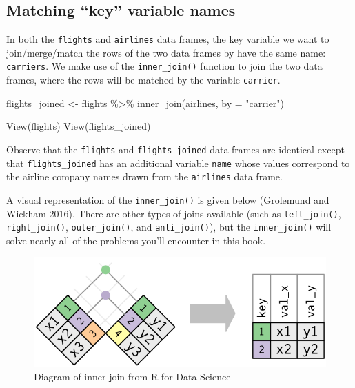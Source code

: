 \documentclass[
  letterpaper,
  DIV=11,
  numbers=noendperiod]{scrreprt}
\newenvironment{Shaded}{\begin{snugshade}}{\end{snugshade}}
\newcommand{\AttributeTok}[1]{\textcolor[rgb]{0.40,0.45,0.13}{#1}}
\newcommand{\FunctionTok}[1]{\textcolor[rgb]{0.28,0.35,0.67}{#1}}
\newcommand{\NormalTok}[1]{\textcolor[rgb]{0.00,0.23,0.31}{#1}}
\newcommand{\OtherTok}[1]{\textcolor[rgb]{0.00,0.23,0.31}{#1}}
\newcommand{\SpecialCharTok}[1]{\textcolor[rgb]{0.37,0.37,0.37}{#1}}
\newcommand{\StringTok}[1]{\textcolor[rgb]{0.13,0.47,0.30}{#1}}
\theoremstyle{definition}
\theoremstyle{remark}
\begin{document}
\hypertarget{matching-key-variable-names}{%
\subsection{Matching ``key'' variable
names}\label{matching-key-variable-names}}

In both the \texttt{flights} and \texttt{airlines} data frames, the key
variable we want to join/merge/match the rows of the two data frames by
have the same name: \texttt{carriers}. We make use of the
\texttt{inner\_join()} function to join the two data frames, where the
rows will be matched by the variable \texttt{carrier}.

\begin{Shaded}
\begin{Highlighting}[]
\NormalTok{flights\_joined }\OtherTok{\textless{}{-}}\NormalTok{ flights }\SpecialCharTok{\%\textgreater{}\%} 
  \FunctionTok{inner\_join}\NormalTok{(airlines, }\AttributeTok{by =} \StringTok{"carrier"}\NormalTok{)}

\FunctionTok{View}\NormalTok{(flights)}
\FunctionTok{View}\NormalTok{(flights\_joined)}
\end{Highlighting}
\end{Shaded}

Observe that the \texttt{flights} and \texttt{flights\_joined} data
frames are identical except that \texttt{flights\_joined} has an
additional variable \texttt{name} whose values correspond to the airline
company names drawn from the \texttt{airlines} data frame.

A visual representation of the \texttt{inner\_join()} is given below
(Grolemund and Wickham 2016). There are other types of joins available
(such as \texttt{left\_join()}, \texttt{right\_join()},
\texttt{outer\_join()}, and \texttt{anti\_join()}), but the
\texttt{inner\_join()} will solve nearly all of the problems you'll
encounter in this book.

\begin{figure}

{\centering \includegraphics{images/join-inner.png}

}

\caption{\label{fig-ij-diagram}Diagram of inner join from R for Data
Science}

\end{figure}
\end{document}
